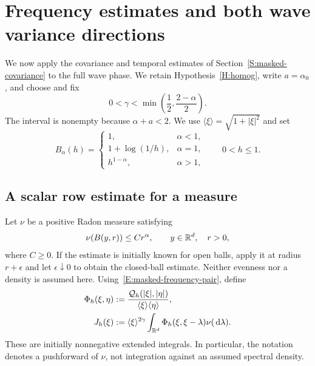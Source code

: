 \section{Frequency estimates and both wave variance directions}
\label{S:wave-variance}

We now apply the covariance and temporal estimates of
Section~\ref{S:masked-covariance} to the full wave phase. We retain
Hypothesis~\ref{H:homog}, write $a = \alpha_0$, and choose and fix
\begin{equation}\label{E:variance-gamma-range}
  0 < \gamma < \min\left(\frac12,\frac{2-\alpha}{2}\right).
\end{equation}
The interval is nonempty because $\alpha+a < 2$. We use $\langle\xi\rangle =
\sqrt{1+|\xi|^2}$ and set
\begin{equation}\label{E:variance-scale-profile}
  B_\alpha(h) =
  \begin{cases}
    1, & \alpha < 1,\\
    1+\log(1/h), & \alpha = 1,\\
    h^{1-\alpha}, & \alpha > 1,
  \end{cases}
  \qquad 0 < h \le 1.
\end{equation}

\subsection{A scalar row estimate for a measure}

Let $\nu$ be a positive Radon measure satisfying
\begin{equation}\label{E:frequency-translated-growth}
  \nu(B(y,r)) \le C r^\alpha,
  \qquad y \in \mathbb{R}^d,\quad r > 0,
\end{equation}
where $C \ge 0$. If the estimate is initially known for open balls, apply it at
radius $r+\epsilon$ and let $\epsilon \downarrow 0$ to obtain the closed-ball
estimate. Neither evenness nor a density is assumed here.
Using~\eqref{E:masked-frequency-pair}, define
\begin{align}
  \Phi_h(\xi,\eta)
  &:= \frac{\mathcal{Q}_h(|\xi|,|\eta|)}
  {\langle\xi\rangle\langle\eta\rangle},
  \label{E:frequency-row-kernel}\\
  J_h(\xi)
  &:= \langle\xi\rangle^{2\gamma}
  \int_{\mathbb{R}^d}\Phi_h(\xi,\xi-\lambda)\nu(\,\mathrm{d}\lambda).
  \label{E:frequency-row-integral}
\end{align}
These are initially nonnegative extended integrals. In particular, the notation
denotes a pushforward of $\nu$, not integration against an assumed spectral
density.

